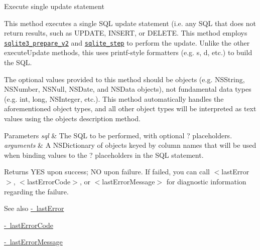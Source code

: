 Execute single update statement

This method executes a single S\+QL update statement (i.\+e. any S\+QL that does not return results, such as {\ttfamily U\+P\+D\+A\+TE}, {\ttfamily I\+N\+S\+E\+RT}, or {\ttfamily D\+E\+L\+E\+TE}. This method employs \href{http://sqlite.org/c3ref/prepare.html}{\tt {\ttfamily sqlite3\+\_\+prepare\+\_\+v2}} and \href{http://sqlite.org/c3ref/step.html}{\tt {\ttfamily sqlite\+\_\+step}} to perform the update. Unlike the other {\ttfamily execute\+Update} methods, this uses printf-\/style formatters (e.\+g. {\ttfamily s}, {\ttfamily d}, etc.) to build the S\+QL.

The optional values provided to this method should be objects (e.\+g. {\ttfamily N\+S\+String}, {\ttfamily N\+S\+Number}, {\ttfamily N\+S\+Null}, {\ttfamily N\+S\+Date}, and {\ttfamily N\+S\+Data} objects), not fundamental data types (e.\+g. {\ttfamily int}, {\ttfamily long}, {\ttfamily N\+S\+Integer}, etc.). This method automatically handles the aforementioned object types, and all other object types will be interpreted as text values using the object\textquotesingle{}s {\ttfamily description} method.


\begin{DoxyParams}{Parameters}
{\em sql} & The S\+QL to be performed, with optional {\ttfamily ?} placeholders.\\
\hline
{\em arguments} & A {\ttfamily N\+S\+Dictionary} of objects keyed by column names that will be used when binding values to the {\ttfamily ?} placeholders in the S\+QL statement.\\
\hline
\end{DoxyParams}
\begin{DoxyReturn}{Returns}
{\ttfamily Y\+ES} upon success; {\ttfamily NO} upon failure. If failed, you can call {\ttfamily $<$last\+Error$>$}, {\ttfamily $<$last\+Error\+Code$>$}, or {\ttfamily $<$last\+Error\+Message$>$} for diagnostic information regarding the failure.
\end{DoxyReturn}
\begin{DoxySeeAlso}{See also}
\mbox{\hyperlink{interface_o_p_t_l_y_f_m_d_b_database_a477a6ff4d9daaac53a56c0a058a0d2f7}{-\/ last\+Error}} 

\mbox{\hyperlink{interface_o_p_t_l_y_f_m_d_b_database_a9f15cf87d3c764783ce0c6beb39393a9}{-\/ last\+Error\+Code}} 

\mbox{\hyperlink{interface_o_p_t_l_y_f_m_d_b_database_a082c5d58576df07956308656064e1f63}{-\/ last\+Error\+Message}} 
\end{DoxySeeAlso}
\mbox{\label{interface_o_p_t_l_y_f_m_d_b_database_a60bf317707b63828faee1d70f28f65f3}} 
